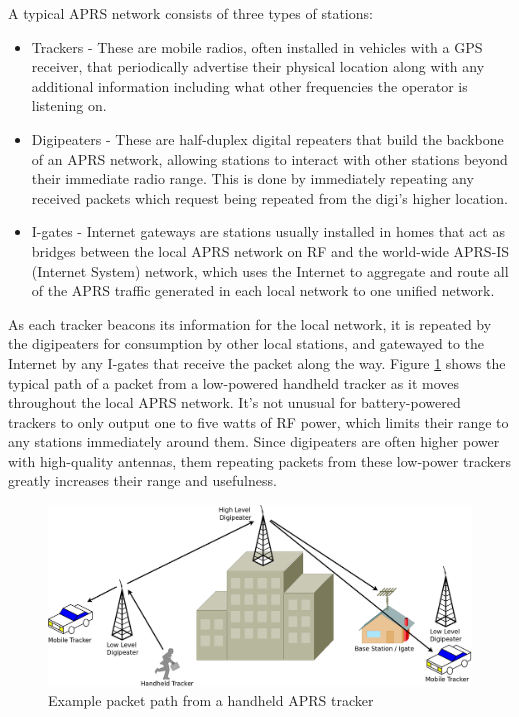 A typical APRS network consists of three types of stations:
\begin{itemize}
	\item Trackers - These are mobile radios, often installed in vehicles with
		a GPS receiver, that periodically advertise their physical location
		along with any additional information including what other frequencies
		the operator is listening on.
	\item Digipeaters - These are half-duplex digital repeaters that build the
		backbone of an APRS network, allowing stations to interact with other
		stations beyond their immediate radio range. This is done by immediately
		repeating any received packets which request being repeated from the
		digi's higher location.
	\item I-gates - Internet gateways are stations usually installed in homes
		that act as bridges between the local APRS network on RF and the
		world-wide APRS-IS (Internet System) network, which uses the Internet
		to aggregate and route all of the APRS traffic generated in each
		local network to one unified network.
\end{itemize} 

As each tracker beacons its information for the local network, it is repeated
by the digipeaters for consumption by other local stations, and gatewayed
to the Internet by any I-gates that receive the packet along the way. 
Figure \ref{fig:demonetwork}
shows the typical path of a packet from a low-powered handheld tracker as it moves
throughout the local APRS network. It's not unusual for battery-powered trackers to
only output one to five watts of RF power, which limits their range to any stations
immediately around them. 
Since digipeaters are often higher power with 
high-quality antennas, them repeating packets from these low-power trackers 
greatly increases their range and usefulness.

\begin{figure}
	\centering
	\includegraphics[width=1.0\textwidth]{src/dia/demonetwork}
	\caption{Example packet path from a handheld APRS tracker}
	\label{fig:demonetwork}
\end{figure}

